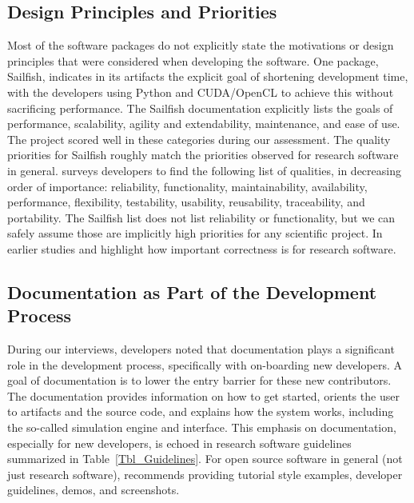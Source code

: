 \documentclass[final, 3p, times, authoryear]{elsarticle}
\begin{document}
\subsection{Design Principles and Priorities} \label{Sec_DesPrincipAndPriorities}

Most of the software packages do not explicitly state the motivations or design
principles that were considered when developing the software. One package,
Sailfish, indicates in its artifacts the explicit goal of shortening development
time, with the developers using Python and CUDA/OpenCL to achieve this without
sacrificing performance. The Sailfish documentation explicitly lists the goals
of performance, scalability, agility and extendability, maintenance, and ease of
use. The project scored well in these categories during our assessment.  The
quality priorities for Sailfish roughly match the priorities observed for
research software in general. \citet{Nguyen-HoanEtAl2010} surveys developers to
find the following list of qualities, in decreasing order of importance:
reliability, functionality, maintainability, availability, performance,
flexibility, testability, usability, reusability, traceability, and portability.
The Sailfish list does not list reliability or functionality, but we can safely
assume those are implicitly high priorities for any scientific project.  In
earlier studies \citet{KellyAndSanders2008} and \citet{CarverEtAl2007} highlight
how important correctness is for research software.

\subsection{Documentation as Part of the Development Process}

During our interviews, developers noted that documentation plays a significant
role in the development process, specifically with on-boarding new developers. A
goal of documentation is to lower the entry barrier for these new contributors.
The documentation provides information on how to get started, orients the user
to artifacts and the source code, and explains how the system works, including
the so-called simulation engine and interface.  This emphasis on documentation,
especially for new developers, is echoed in research software guidelines
summarized in Table~\ref{Tbl_Guidelines}. For open source software in general
(not just research software), \citet{Fogel2005} recommends providing tutorial
style examples, developer guidelines, demos, and screenshots.
\end{document}
